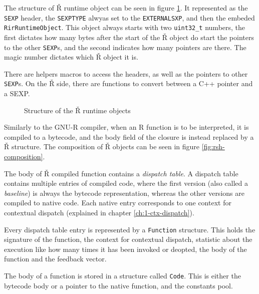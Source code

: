 The structure of Ř runtime object can be seen in figure \ref{fig:rsh-object-struct}. It represented as the \texttt{SEXP} header, the \texttt{SEXPTYPE} alwyas set to the \texttt{EXTERNALSXP}, and then the embeded \texttt{RirRuntimeObject}. This object always starts with two \texttt{uint32\_t} numbers, the first dictates how many bytes after the start of the Ř object do start the pointers to the other \texttt{SEXP}s, and the second indicates how many pointers are there. The magic number dictates which Ř object it is.

There are helpers macros to access the headers, as well as the pointers to other \texttt{SEXP}s. On the Ř side, there are functions to convert between a C++ pointer and a SEXP.

\begin{figure}
	\centering
	\begin{adjustbox}{trim=10 80pt 0 0, clip}
	\end{adjustbox}
	\caption{Structure of the Ř runtime objects}\label{fig:rsh-object-struct}
\end{figure}

Similarly to the GNU-R compiler, when an R function is to be interpreted, it is compiled to a bytecode, and the body field of the closure is instead replaced by a Ř structure. The composition of Ř objects can be seen in figure \ref{fig:rsh-composition}.

The body of Ř compiled function contains a \textit{dispatch table}. A dispatch table contains multiple entries of compiled code, where the first version (also called a \textit{baseline}) is always the bytecode representation, whereas the other versions are compiled to native code. Each native entry corresponds to one context for contextual dispatch (explained in chapter \ref{ch:1-ctx-dispatch}).

Every dispatch table entry is represented by a \texttt{Function} structure. This holds the signature of the function, the context for contextual dispatch, statistic about the execution like how many times it has been invoked or deopted, the body of the function and the feedback vector.

The body of a function is stored in a structure called \texttt{Code}. This is either the bytecode body or a pointer to the native function, and the constants pool.

